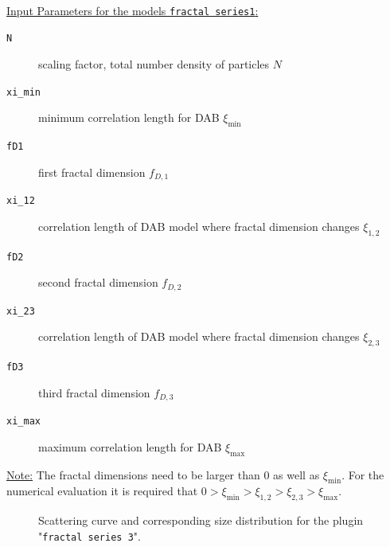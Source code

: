 \hspace{1pt}\\
\underline{Input Parameters for the models \texttt{fractal series1}:}\\
\begin{description}
\item[\texttt{N}] scaling factor, total number density of particles $N$
\item[\texttt{xi\_min}] minimum correlation length for DAB $\xi_\mathrm{min}$
\item[\texttt{fD1}] first fractal dimension $f_{D,1}$
\item[\texttt{xi\_12}] correlation length of DAB model where fractal dimension changes $\xi_{1,2}$
\item[\texttt{fD2}] second fractal dimension $f_{D,2}$
\item[\texttt{xi\_23}] correlation length of DAB model where fractal dimension changes $\xi_{2,3}$
\item[\texttt{fD3}] third fractal dimension $f_{D,3}$
\item[\texttt{xi\_max}] maximum correlation length for DAB $\xi_\mathrm{max}$
\end{description}
\noindent\underline{Note:}
The fractal dimensions need to be larger than 0 as well as $\xi_\mathrm{min}$. For the numerical evaluation it is required that $0>\xi_\mathrm{min}>\xi_{1,2}>\xi_{2,3}>\xi_\mathrm{max}$.

\begin{figure}[htb]
\captionsetup[subfigure]{position=b}
\centering
{}
\hfill
{}
\caption{Scattering curve and corresponding size distribution for the plugin "\texttt{fractal series 3}".}
\end{figure}

